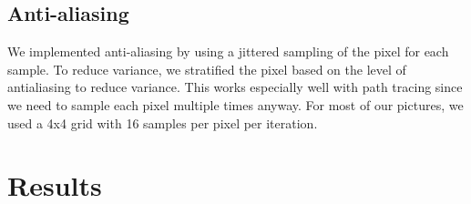 \documentclass[11pt]{article}
\begin{document}
\subsection{Anti-aliasing}

We implemented anti-aliasing by using a jittered sampling of the pixel for each sample. To reduce variance, we stratified the pixel based on the level of antialiasing to reduce variance. This works especially well with path tracing since we need to sample each pixel multiple times anyway. For most of our pictures, we used a 4x4 grid with 16 samples per pixel per iteration. 

\section{Results}
\end{document}
